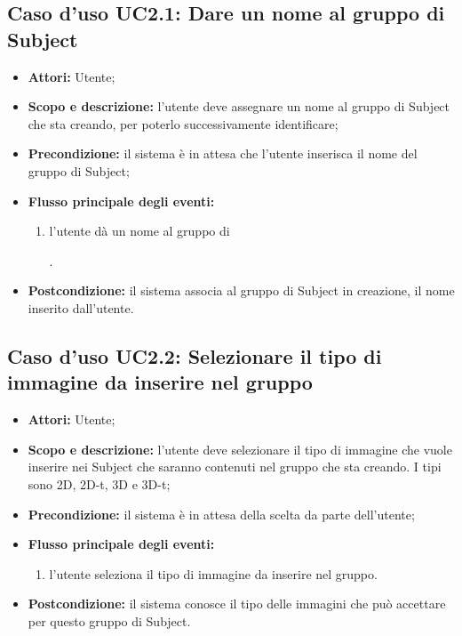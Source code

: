 \subsection{Caso d'uso UC2.1: Dare un nome al gruppo di Subject}
\begin{itemize}
\item \textbf{Attori:} Utente;
\item \textbf{Scopo e descrizione:} l'utente deve assegnare un nome al gruppo di Subject\glossario{} che sta creando, per poterlo successivamente identificare;
\item \textbf{Precondizione:} il sistema è in attesa che l'utente inserisca il nome del gruppo di Subject\glossario{};
\item \textbf{Flusso principale degli eventi:}
\begin{enumerate}
\item l'utente dà un nome al gruppo di \subject{}.
\end{enumerate}
\item \textbf{Postcondizione:} il sistema associa al gruppo di Subject\glossario{} in creazione, il nome inserito dall'utente.
\end{itemize}

\subsection{Caso d'uso UC2.2: Selezionare il tipo di immagine da inserire nel gruppo}
\begin{itemize}
\item \textbf{Attori:} Utente;
\item \textbf{Scopo e descrizione:} l'utente deve selezionare il tipo di immagine che vuole inserire nei Subject\glossario{} che saranno contenuti nel gruppo che sta creando. I tipi sono 2D, 2D-t, 3D e 3D-t;
\item \textbf{Precondizione:} il sistema è in attesa della scelta da parte dell'utente;
\item \textbf{Flusso principale degli eventi:}
\begin{enumerate}
\item l'utente seleziona il tipo di immagine da inserire nel gruppo.
\end{enumerate}
\item \textbf{Postcondizione:} il sistema conosce il tipo delle immagini che può accettare per questo gruppo di Subject\glossario{}.
\end{itemize}

